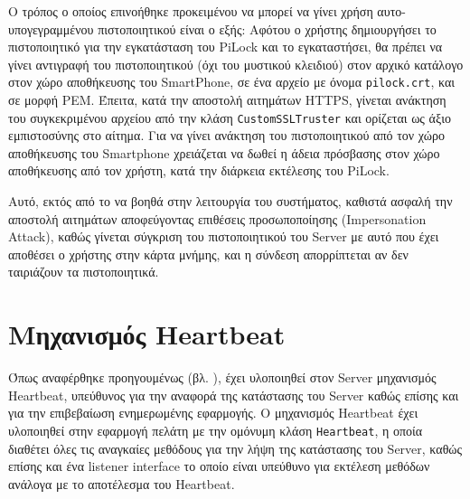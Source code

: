 		Ο τρόπος ο οποίος επινοήθηκε προκειμένου να μπορεί να γίνει χρήση αυτο-υπογεγραμμένου πιστοποιητικού είναι ο εξής: Αφότου ο χρήστης δημιουργήσει το πιστοποιητικό για την εγκατάσταση του PiLock και το εγκαταστήσει, θα πρέπει να γίνει αντιγραφή του πιστοποιητικού (όχι του μυστικού κλειδιού) στον αρχικό κατάλογο στον χώρο αποθήκευσης του SmartPhone, σε ένα αρχείο με όνομα \verb|pilock.crt|, και σε μορφή PEM. Έπειτα, κατά την αποστολή αιτημάτων HTTPS, γίνεται ανάκτηση του συγκεκριμένου αρχείου από την κλάση \verb|CustomSSLTruster| και ορίζεται ως άξιο εμπιστοσύνης στο αίτημα. Για να γίνει ανάκτηση του πιστοποιητικού από τον χώρο αποθήκευσης του Smartphone χρειάζεται να δωθεί η άδεια πρόσβασης στον χώρο αποθήκευσης από τον χρήστη, κατά την διάρκεια εκτέλεσης του PiLock.

		Αυτό, εκτός από το να βοηθά στην λειτουργία του συστήματος, καθιστά ασφαλή την αποστολή αιτημάτων αποφεύγοντας επιθέσεις προσωποποίησης (Impersonation Attack), καθώς γίνεται σύγκριση του πιστοποιητικού του Server με αυτό που έχει αποθέσει ο χρήστης στην κάρτα μνήμης, και η σύνδεση απορρίπτεται αν δεν ταιριάζουν τα πιστοποιητικά.

\section{Μηχανισμός Heartbeat}
	Όπως αναφέρθηκε προηγουμένως (βλ. ), έχει υλοποιηθεί στον Server μηχανισμός Heartbeat, υπεύθυνος για την αναφορά της κατάστασης του Server καθώς επίσης και για την επιβεβαίωση ενημερωμένης εφαρμογής. Ο μηχανισμός Heartbeat έχει υλοποιηθεί στην εφαρμογή πελάτη με την ομόνυμη κλάση \verb|Heartbeat|, η οποία διαθέτει όλες τις αναγκαίες μεθόδους για την λήψη της κατάστασης του Server, καθώς επίσης και ένα listener interface το οποίο είναι υπεύθυνο για εκτέλεση μεθόδων ανάλογα με το αποτέλεσμα του Heartbeat. 

